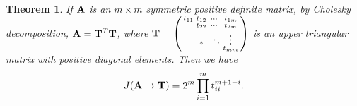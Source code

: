 \documentclass[11pt]{article}
\def\A{{\bf A}}
\def\T{{\bf T}}
\newtheorem{theorem}{Theorem}[section]
\begin{document}
\begin{theorem}
	If $\A$ is an $m\times m$ symmetric positive definite matrix, by Cholesky decomposition, $\A=\T^T\T$, where $\T =\left( \begin{smallmatrix} 
						t_{11}	& t_{12}	& \cdots 	& t_{1m}\\	
						\quad	& t_{22} 	& \cdots 	& t_{2m} \\
						\quad	& *		& \ddots 	& \vdots \\
						\quad 	&\quad 	& \quad	& t_{mm}\\
					  \end{smallmatrix}\right)$ is an upper triangular matrix with positive diagonal elements. Then we have 
	\begin{equation}
		J(\A\rightarrow \T) = 2^m \prod_{i=1}^m t_{ii}^{m+1-i}.
	\end{equation}
\end{theorem}
\end{document}
